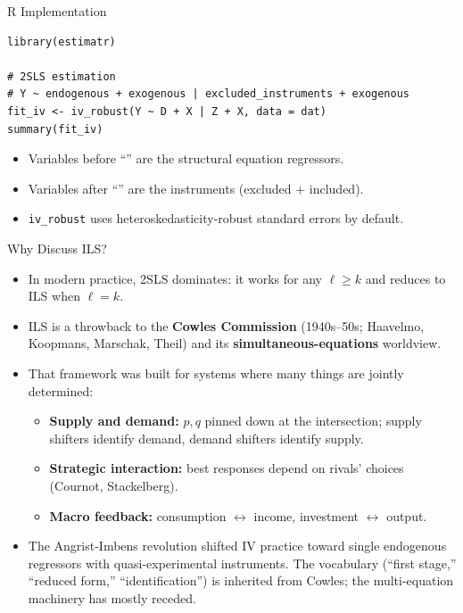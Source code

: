 \documentclass[aspectratio=169, handout]{beamer}
\numberwithin{equation}{section}
\begin{document}
\begin{frame}[fragile]{R Implementation}
\begin{lstlisting}
library(estimatr)

# 2SLS estimation
# Y ~ endogenous + exogenous | excluded_instruments + exogenous
fit_iv <- iv_robust(Y ~ D + X | Z + X, data = dat)
summary(fit_iv)
\end{lstlisting}
\begin{itemize}
\item Variables before ``\textbar'' are the structural equation regressors.
\item Variables after ``\textbar'' are the instruments (excluded + included).
\item \texttt{iv\_robust} uses heteroskedasticity-robust standard errors by default.
\end{itemize}
\end{frame}


\begin{frame}{Why Discuss ILS?}
\begin{itemize}
\item In modern practice, 2SLS dominates: it works for any $\ell\geq k$ and reduces to ILS when $\ell=k$.
\item ILS is a throwback to the \textbf{Cowles Commission} (1940s--50s; Haavelmo, Koopmans, Marschak, Theil) and its \textbf{simultaneous-equations} worldview.
\item That framework was built for systems where many things are jointly determined:
\begin{itemize}
\item \textbf{Supply and demand:} $p,q$ pinned down at the intersection; supply shifters identify demand, demand shifters identify supply.
\item \textbf{Strategic interaction:} best responses depend on rivals' choices (Cournot, Stackelberg).
\item \textbf{Macro feedback:} consumption $\leftrightarrow$ income, investment $\leftrightarrow$ output.
\end{itemize}
\item The Angrist-Imbens revolution shifted IV practice toward single endogenous regressors with quasi-experimental instruments. The vocabulary (``first stage,'' ``reduced form,'' ``identification'') is inherited from Cowles; the multi-equation machinery has mostly receded.
\end{itemize}
\end{frame}
\end{document}

